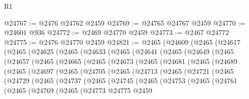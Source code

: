\begin{lexlean}{R1}
\begin{coremodule}
@24767 := @2476 @24762 @2459
@24769 := @24765 @24767 @2459
@24770 := @24601 @936
@24772 := @2469 @24770 @2459
@24773 := @2467 @24772
@24775 := @2476 @24770 @2459
@24821 := @2465
    (@24609
      (@2465
        (@24617
          (@2465
            (@24625
              (@2465
                (@24633
                  (@2465
                    (@24641
                      (@2465
                        (@24649
                          (@2465
                            (@24657
                              (@2465
                                (@24665
                                  (@2465
                                    (@24673
                                      (@2465
                                        (@24681
                                          (@2465
                                            (@24689
                                              (@2465
                                                (@24697
                                                  (@2465
                                                    (@24705
                                                      (@2465
                                                        (@24713
                                                          (@2465
                                                            (@24721
                                                              (@2465
                                                                (@24729
                                                                  (@2465
                                                                    (@24737
                                                                      (@2465
                                                                        (@24745
                                                                          (@2465
                                                                            (@24753
                                                                              (@2465
                                                                                (@24761
                                                                                  (@2465
                                                                                    (@24769
                                                                                      (@2465
                                                                                        (@24773
                                                                                          @24775
                                                                                          @2459

\end{coremodule}
\end{lexlean}
